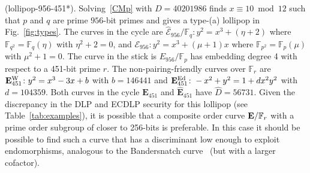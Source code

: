 \documentclass[version=preprint]{iacrcc}
\newcommand{\F}{\mathbb{F}}
\newcommand{\EC}{\mathcal{E}}
\begin{document}
\begin{example}(\textsf{lollipop-956-451}*). \label{example:956-451} Solving~\eqref{CMp} with $D=40201986$ finds $x \equiv 10 \bmod{12}$ such that $p$ and $q$ are prime $956$-bit primes and gives a type-(a) lollipop in Fig.~\ref{fig:types}. The curves in the cycle are $\hat{\EC}_{956}/\F_q \colon y^2=x^3+(\eta+2)$ where  $\F_{q^2}=\F_q(\eta)$ with $\eta^2+2=0$, and ${\EC}_{956} \colon y^2=x^3+(\mu+1)x$ where $\F_{p^2}=\F_p(\mu)$ with $\mu^2+1=0$. The curve in the stick is $E_{956}/\F_p$ has embedding degree 4 with respect to a 451-bit prime $r$. The non-pairing-friendly curves over $\F_r$ are $\mathbf{E}_{451}^{\rm W} \colon y^2=x^3-3x+b$ with $b=146441$ and $\mathbf{E}_{451}^{\rm Ed} \colon -x^2+y^2=1+dx^2y^2$ with $d=104359$. Both curves in the cycle $\mathbf{E}_{451}$ and $\hat{\mathbf{E}}_{451}$ have $\hat{D}=56731$. Given the discrepancy in the DLP and ECDLP security for this lollipop (see Table~\ref{tab:examples}), it is possible that a composite order curve ${\bf E}/\F_r$ with a prime order subgroup of closer to 256-bits is preferable. In this case it should be possible to find such a curve that has a discriminant low enough to exploit endomorphisms, analogous to the Bandersnatch curve~\cite{bandersnatch} (but with a larger cofactor). 
\end{example}
\end{document}
